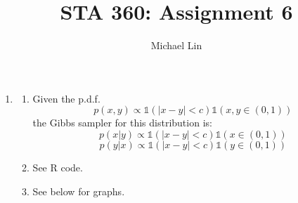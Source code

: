 \documentclass{article}
\title{STA 360: Assignment 6}
\author{Michael Lin}
\begin{document}
\maketitle

\begin{enumerate}
\item
\begin{enumerate}
\item Given the p.d.f.
$$ p(x,y) \propto \mathds{1}(|x-y|<c)\mathds{1}(x,y\in (0,1)) $$
the Gibbs sampler for this distribution is:
$$ p(x|y) \propto \mathds{1}(|x-y|<c)\mathds{1}(x \in (0,1))$$
$$ p(y|x) \propto \mathds{1}(|x-y|<c)\mathds{1}(y \in (0,1))$$

\item See R code.

\item See below for graphs.


\end{enumerate}
\end{enumerate}
\end{document}
